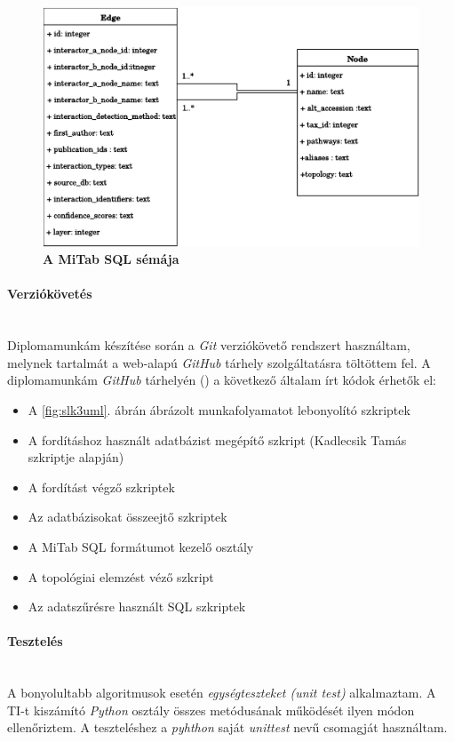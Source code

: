 \documentclass[a4paper,12pt]{article}
\begin{document}
				\begin{figure}[H]
					 \includegraphics[scale=0.7]{img/Mitab-SQL.pdf}
			 		 \centering
			 		 \caption{ \textbf{A MiTab SQL sémája} }
			 		 \label{fig:mitab_scheme}			 		 
				\end{figure}
				
			\paragraph{Verziókövetés} \mbox{}\\
			Diplomamunkám készítése során a \textit{Git} verziókövető rendszert használtam, melynek tartalmát a web-alapú \textit{GitHub} tárhely szolgáltatásra töltöttem fel. A diplomamunkám \textit{GitHub} tárhelyén (\cite{github}) a következő általam írt kódok érhetők el: 
				\begin{itemize}
						\item A \ref{fig:slk3uml}. ábrán ábrázolt munkafolyamatot lebonyolító szkriptek
						\item A fordításhoz használt adatbázist megépítő szkript (Kadlecsik Tamás szkriptje alapján)
						\item A fordítást végző szkriptek
						\item Az adatbázisokat összeejtő szkriptek
						\item A MiTab SQL formátumot kezelő osztály
						\item A topológiai elemzést véző szkript
						\item Az adatszűrésre használt SQL szkriptek
				\end{itemize}
				
			\paragraph{Tesztelés} \mbox{}\\
			A bonyolultabb algoritmusok esetén \textit{egységteszteket (unit test)} alkalmaztam. A TI-t kiszámító \textit{Python} osztály összes metódusának működését ilyen módon ellenőriztem. A teszteléshez a \textit{pyhthon} saját \textit{unittest} nevű csomagját használtam.
				
\end{document}
